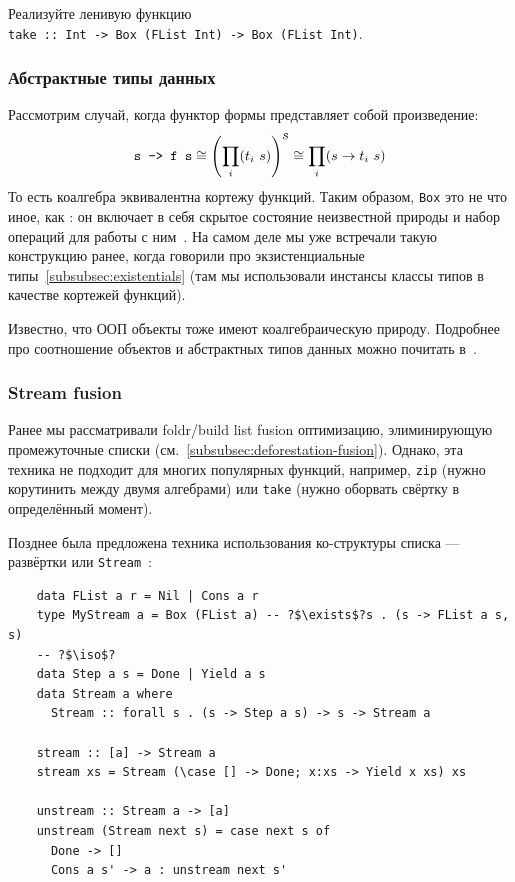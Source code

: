 \begin{task}
    Реализуйте ленивую функцию \\ \texttt{take :: Int -> Box (FList Int) -> Box (FList Int)}.
\end{task}

\subsubsection{Абстрактные типы данных} \label{subsubsec:abstract-data-types}

Рассмотрим случай, когда функтор формы представляет собой произведение:
\[
    \text{\texttt{s -> f s}} \cong \left( \prod_{i}(t_i~ s) \right)^{\displaystyle s} \cong \prod_i(s\to t_i~ s)
\]
То есть коалгебра эквивалентна кортежу функций.
Таким образом, \texttt{Box} это не что иное, как : он включает в себя скрытое состояние неизвестной природы и набор операций для работы с ним~\cite{gibbons2008unfolding}.
На самом деле мы уже встречали такую конструкцию ранее, когда говорили про экзистенциальные типы~\ref{subsubsec:existentials} (там мы использовали инстансы классы типов в качестве кортежей функций).

Известно, что ООП объекты тоже имеют коалгебраическую природу.
Подробнее про соотношение объектов и абстрактных типов данных можно почитать в~\cite{cook2009understanding}.

\subsubsection{Stream fusion} \label{subsubsec:stream-fusion}

Ранее мы рассматривали foldr/build list fusion оптимизацию, элиминирующую промежуточные списки (см.~\ref{subsubsec:deforestation-fusion}).
Однако, эта техника не подходит для многих популярных функций, например, \texttt{zip} (нужно корутинить между двумя алгебрами) или \texttt{take} (нужно оборвать свёртку в определённый момент).

Позднее была предложена техника использования ко-структуры списка --- развёртки или \texttt{Stream}~\cite{coutts2007stream}:
\begin{verbatim}
    data FList a r = Nil | Cons a r
    type MyStream a = Box (FList a) -- ?$\exists$?s . (s -> FList a s, s)
    -- ?$\iso$?
    data Step a s = Done | Yield a s
    data Stream a where
      Stream :: forall s . (s -> Step a s) -> s -> Stream a

    stream :: [a] -> Stream a
    stream xs = Stream (\case [] -> Done; x:xs -> Yield x xs) xs

    unstream :: Stream a -> [a]
    unstream (Stream next s) = case next s of
      Done -> []
      Cons a s' -> a : unstream next s'
\end{verbatim}

